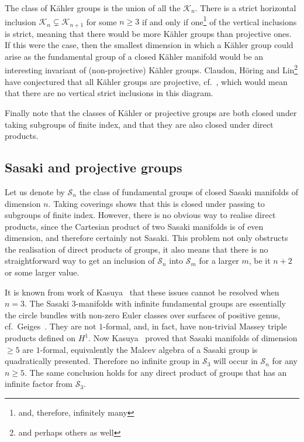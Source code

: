 \documentclass[12pt,leqno]{amsart}
\newcommand{\Kg}{\mathcal{K}}
\newcommand{\Sg}{\mathcal{S}}
\begin{document}
The class of K\"ahler groups is the union of all the $\Kg_n$. There is a strict horizontal inclusion
$\Kg_n\subsetneq\Kg_{n+1}$ for some $n\geq 3$ if and only if one\footnote{and, therefore, infinitely many} 
of the vertical inclusions is strict,
meaning that there would be more K\"ahler groups than projective ones. If this were the case, then the 
smallest dimension in which a K\"ahler group could arise as the fundamental group of a closed 
K\"ahler manifold would be an interesting invariant of (non-projective) K\"ahler groups. Claudon, H\"oring and 
Lin\footnote{and perhaps others as well} have 
conjectured that all K\"ahler groups are projective, cf.~\cite[Conjecture~1.1]{CHL}, which would mean
that there are no vertical strict inclusions in this diagram.

Finally note that the classes of K\"ahler or projective groups are both closed under taking subgroups 
of finite index, and that they are also closed under direct products.


 \subsection{Sasaki and projective groups}
 
 Let us denote by $\Sg_n$ the class of fundamental groups of closed Sasaki manifolds of 
 dimension $n$. Taking coverings shows that this is closed under passing to subgroups of 
 finite index. However, there is no obvious way to realise direct products, since the Cartesian
 product of two Sasaki manifolds is of even dimension, and therefore certainly not Sasaki.
 This problem not only obstructs the realisation of direct products of groups, it also 
 means that there is no straightforward way to get an inclusion of $\Sg_n$ into $\Sg_m$ for 
 a larger $m$, be it $n+2$ or some larger value.
 
 It is known from work of Kasuya~\cite{Kas1} that these issues cannot be resolved when $n=3$.
 The Sasaki $3$-manifolds with infinite fundamental groups are essentially the circle bundles 
 with non-zero Euler classes over surfaces of positive genus, cf.~Geiges~\cite{Geiges}.
 They are not $1$-formal, and, in fact, have non-trivial Massey triple products defined
 on $H^1$. Now Kasuya~\cite[Theorem~1.1]{Kas1} proved that Sasaki manifolds of dimension $\geq 5$
 are $1$-formal, equivalently the Malcev algebra of a Sasaki group is quadratically presented.
 Therefore no infinite group in $\Sg_3$ will occur in $\Sg_n$ for any $n\geq 5$.
The same conclusion holds for any direct product of groups that has an infinite factor from $\Sg_3$.
\end{document}

